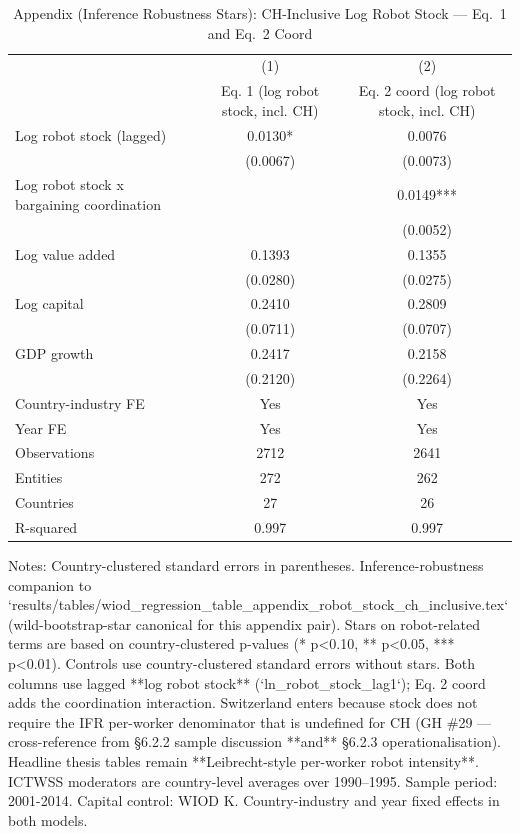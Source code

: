 \begin{table}[!htbp]
\centering
\begin{threeparttable}
\caption{Appendix (Inference Robustness Stars): CH-Inclusive Log Robot Stock --- Eq.\ 1 and Eq.\ 2 Coord}
\label{tab:wiod_appendix_robot_stock_ch_inclusive_clusterstars}
\small
\begin{tabular}{lcc}
\toprule
 & (1) & (2) \\
 & Eq. 1 (log robot stock, incl. CH) & Eq. 2 coord (log robot stock, incl. CH) \\
\midrule
Log robot stock (lagged) & 0.0130* & 0.0076 \\
 & (0.0067) & (0.0073) \\
\addlinespace[0.2em]
Log robot stock x bargaining coordination &  & 0.0149*** \\
 &  & (0.0052) \\
\addlinespace[0.2em]
Log value added & 0.1393 & 0.1355 \\
 & (0.0280) & (0.0275) \\
\addlinespace[0.2em]
Log capital & 0.2410 & 0.2809 \\
 & (0.0711) & (0.0707) \\
\addlinespace[0.2em]
GDP growth & 0.2417 & 0.2158 \\
 & (0.2120) & (0.2264) \\
\midrule
Country-industry FE & Yes & Yes \\
Year FE & Yes & Yes \\
Observations & 2712 & 2641 \\
Entities & 272 & 262 \\
Countries & 27 & 26 \\
R-squared & 0.997 & 0.997 \\
\bottomrule
\end{tabular}
\begin{tablenotes}[flushleft]
\footnotesize
\item Notes: Country-clustered standard errors in parentheses. Inference-robustness companion to `results/tables/wiod\_regression\_table\_appendix\_robot\_stock\_ch\_inclusive.tex` (wild-bootstrap-star canonical for this appendix pair). Stars on robot-related terms are based on country-clustered p-values (* p<0.10, ** p<0.05, *** p<0.01). Controls use country-clustered standard errors without stars. Both columns use lagged **log robot stock** (`ln\_robot\_stock\_lag1`); Eq. 2 coord adds the coordination interaction. Switzerland enters because stock does not require the IFR per-worker denominator that is undefined for CH (GH \#29 — cross-reference from §6.2.2 sample discussion **and** §6.2.3 operationalisation). Headline thesis tables remain **Leibrecht-style per-worker robot intensity**. ICTWSS moderators are country-level averages over 1990–1995. Sample period: 2001-2014. Capital control: WIOD K. Country-industry and year fixed effects in both models.
\end{tablenotes}
\end{threeparttable}
\end{table}
